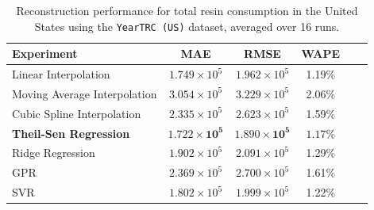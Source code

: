 \begin{table}[!ht]
	\centering
	\caption{\centering Reconstruction performance for total resin consumption in the United States using the \texttt{YearTRC (US)} dataset, averaged over 16 runs.}
	\begin{tabular}{@{}lccccc@{}}
		\toprule
		\textbf{Experiment}          & \textbf{MAE}                   & \textbf{RMSE}                  & \textbf{WAPE}       \\
		\midrule
		Linear Interpolation         & \(1.749 \times 10^5\)          & \(1.962 \times 10^5\)          & 1.19\%              \\
		Moving Average Interpolation & \(3.054 \times 10^5\)          & \(3.229 \times 10^5\)          & 2.06\%              \\
		Cubic Spline Interpolation   & \(2.335 \times 10^5\)          & \(2.623 \times 10^5\)          & 1.59\%              \\
		\textbf{Theil-Sen Regression} & \(\mathbf{1.722 \times 10^5}\) & \(\mathbf{1.890 \times 10^5}\) & \(\mathbf{1.17}\)\% \\
		Ridge Regression             & \(1.902 \times 10^5\)          & \(2.091 \times 10^5\)          & 1.29\%              \\
		GPR                          & \(2.369 \times 10^5\)          & \(2.700 \times 10^5\)          & 1.61\%              \\
		SVR                          & \(1.802 \times 10^5\)          & \(1.999 \times 10^5\)          & 1.22\%              \\
		\hline
	\end{tabular}
	\label{tab:reconstruction_united_states_trc}
\end{table}
